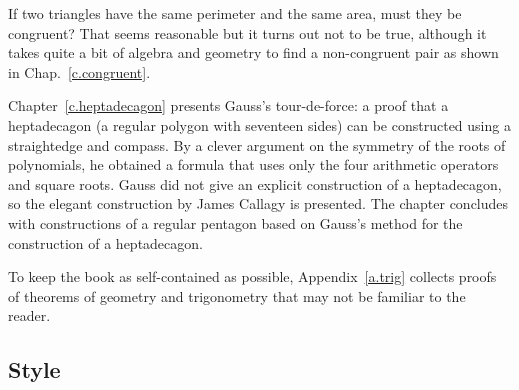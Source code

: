 If two triangles have the same perimeter and the same area, must they be congruent? That seems reasonable but it turns out not to be true, although it takes quite a bit of algebra and geometry to find a non-congruent pair as shown in Chap.~\ref{c.congruent}.

Chapter~\ref{c.heptadecagon} presents Gauss's tour-de-force: a proof that a heptadecagon (a regular polygon with seventeen sides) can be constructed using a straightedge and compass. By a clever argument on the symmetry of the roots of polynomials, he obtained a formula that uses only the four arithmetic operators and square roots. Gauss did not give an explicit construction of a heptadecagon, so the elegant construction by James Callagy is presented. The chapter concludes with constructions of a regular pentagon based on Gauss's method for the construction of a heptadecagon.

To keep the book as self-contained as possible, Appendix~\ref{a.trig} collects proofs of theorems of geometry and trigonometry that may not be familiar to the reader.

\subsection*{Style}

